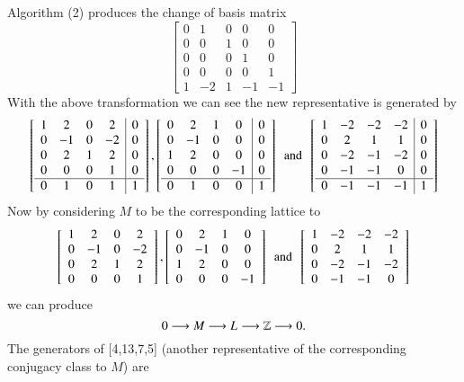 Algorithm (2) produces the change of basis matrix 
$$
 \left[ \begin {array}{ccccc} 0&1&0&0&0\\ 0&0&1&0&0
\\ 0&0&0&1&0\\ 0&0&0&0&1
\\ 1&-2&1&-1&-1\end {array} \right] 
$$
With the above transformation we can see the new representative is generated by 
$$
 \left[ \begin {array}{cccc|c} 1&2&0&2&0\\0&-1&0&-2&0
\\0&2&1&2&0\\0&0&0&1&0
\\ \hline 0&1&0&1&1\end {array} \right], 
 \left[ \begin {array}{cccc|c} 0&2&1&0&0\\0&-1&0&0&0
\\1&2&0&0&0\\0&0&0&-1&0
\\ \hline 0&1&0&0&1\end {array} \right] 
\,\,\, \text{and} \,\,\,
 \left[ \begin {array}{cccc|c} 1&-2&-2&-2&0\\0&2&1&1
&0\\0&-2&-1&-2&0\\0&-1&-1&0&0
\\ \hline 0&-1&-1&-1&1\end {array} \right] 
$$
Now by considering $M$ to be the corresponding lattice to 
$$
 \left[ \begin {array}{cccc} 1&2&0&2\\0&-1&0&-2
\\0&2&1&2\\0&0&0&1\end {array}
 \right], 
 \left[ \begin {array}{cccc} 0&2&1&0\\0&-1&0&0
\\1&2&0&0\\0&0&0&-1\end {array}
 \right] 
 \,\,\, \text{and} \,\,\,
 \left[ \begin {array}{cccc} 1&-2&-2&-2\\0&2&1&1
\\0&-2&-1&-2\\0&-1&-1&0
\end {array} \right] 
$$
we can produce
$$
0 \longrightarrow M_{} \longrightarrow L_{} \longrightarrow \mathbb{Z} \longrightarrow 0
.$$
The generators of [4,13,7,5] (another representative of the corresponding conjugacy class to $M$) are 
